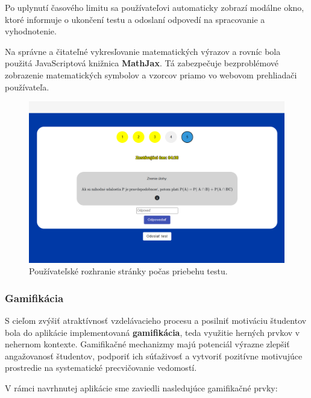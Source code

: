 Po uplynutí časového limitu sa používateľovi automaticky zobrazí modálne okno, ktoré informuje o ukončení testu a odoslaní odpovedí na spracovanie a vyhodnotenie.

Na správne a čitateľné vykresľovanie matematických výrazov a rovníc bola použitá JavaScriptová knižnica \textbf{MathJax}.
 Tá zabezpečuje bezproblémové zobrazenie matematických symbolov a vzorcov priamo vo webovom prehliadači používateľa.
\begin{figure}[h!]
  \centering
  \includegraphics[width=14cm]{img/test-writing.png}
  \caption{Používateľské rozhranie stránky počas priebehu testu.}
  \label{test-writing}
\end{figure}



\subsubsection{Gamifikácia}

S cieľom zvýšiť atraktívnosť vzdelávacieho procesu a posilniť motiváciu študentov bola do aplikácie implementovaná \textbf{gamifikácia}, teda využitie herných prvkov v nehernom kontexte. 
Gamifikačné mechanizmy majú potenciál výrazne zlepšiť angažovanosť študentov, podporiť ich súťaživosť a vytvoriť pozitívne motivujúce prostredie na systematické precvičovanie vedomostí.

V rámci navrhnutej aplikácie sme zaviedli nasledujúce gamifikačné prvky:

